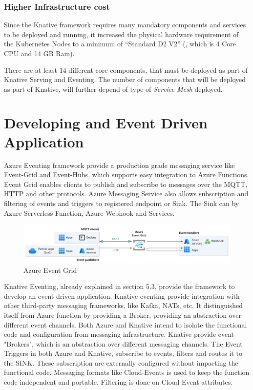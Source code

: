 \documentclass{article}
\begin{document}
\begin{flushleft}
\subsubsection{Higher Infrastructure cost}
Since the Knative framework requires many mandatory components and services to be deployed and running, it increased the physical hardware requirement of the Kubernetes Nodes to a minimum of “Standard D2 V2” (, which is 4 Core CPU and 14 GB Ram). 
\par
There are at-least 14 different core components, that must be deployed as part of Knative Serving and Eventing. The number of components that will be deployed as part of Knative, will further depend of type of \textit{Service Mesh} deployed. 
\end{flushleft}
\pagebreak
\section{Developing and Event Driven Application}
\begin{flushleft}
Azure Eventing framework provide a production grade messaging service like Event-Grid and Event-Hubs, which supports easy integration to Azure Functions. Event Grid enables clients to publish and subscribe to messages over the MQTT, \gls{HTTP} and other protocols. Azure Messaging Service also allows subscription and filtering of events and triggers to registered endpoint or Sink. The Sink can by Azure Serverless Function, Azure Webhook and Services. 
\begin{figure}[h]
    \centering
    \includegraphics[width=1.00\linewidth]{images/general-event-grid.png}
    \caption{Azure Event Grid}
\end{figure}
 
\par
Knative Eventing, already explained in section 5.3, provide the framework to develop an event driven application. Knative eventing provide integration with other third-party messaging frameworks, like Kafka, NATs, etc. It distinguished itself from Azure function by providing a Broker, providing an abstraction over different event channels. 
\hfill\break
Both Azure and Knative intend to isolate the functional code and configuration from messaging infrastructure. Knative provide event "Brokers", which is an abstraction over different messaging channels. 
\hfill\break
The Event Triggers in both Azure and Knative, subscribe to events, filters and routes it to the SINK. These subscription are externally configured without impacting the functional code. Messaging formats like Cloud-Events is used to keep the function code independent and portable. Filtering is done on Cloud-Event attributes. 
\end{flushleft}
\pagebreak
\end{document}

